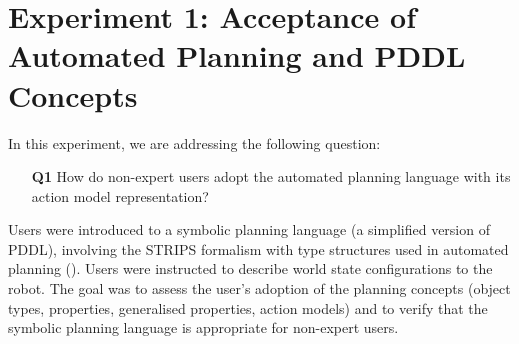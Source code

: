 
\section{Experiment 1: Acceptance of Automated Planning and PDDL Concepts}\label{sec:Exp1}

In this experiment, we are addressing the following question:

\begin{enumerate}
	\item[\textbf{Q1}] How do non-expert users adopt the automated planning language with its action model representation?
\end{enumerate}

Users were introduced to a symbolic planning language (a simplified version of PDDL), involving the STRIPS formalism with type structures used in automated planning ().
Users were instructed to describe world state configurations to the robot.
The goal was to assess the user's adoption of the planning concepts (object types, properties, generalised properties, action models) and to verify that the symbolic planning language is appropriate for non-expert users.

